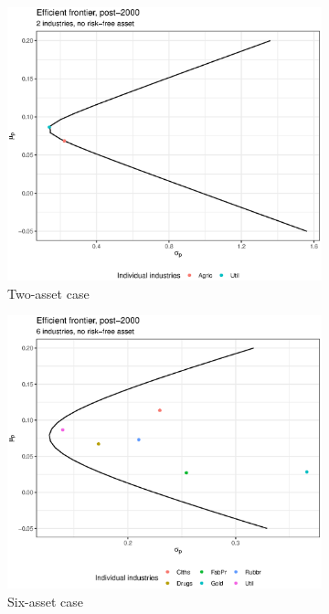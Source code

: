 \documentclass[11pt]{article}
\begin{document}
\begin{enumerate}
	\begin{figure}[!t]
		\caption{Efficient Frontiers, Post-2000}
		\begin{subfigure}{.5\textwidth}
			\centering
			\includegraphics[width=.8\linewidth]{plot_7a.eps}
			\caption{Two-asset case}
			\label{fig3_a}
		\end{subfigure}%
		\begin{subfigure}{.5\textwidth}
			\centering
			\includegraphics[width=.8\linewidth]{plot_7b.eps}
			\caption{Six-asset case}
			\label{fig3_b}
		\end{subfigure}
		\begin{subfigure}{.5\textwidth}
			\centering

\end{subfigure}
\end{figure}
\end{enumerate}
\end{document}
